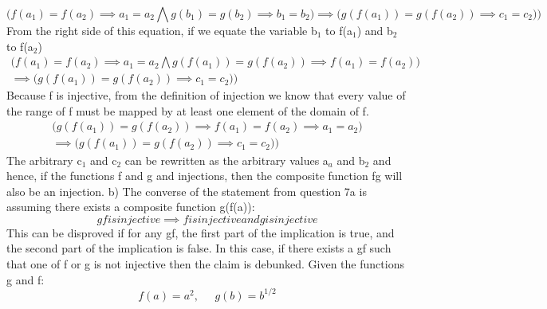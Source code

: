 \documentclass[11pt]{article}
\begin{document}
\begin{enumerate}
\begin{equation}
        \bigg( f(a_{1}) = f(a_{2}) \implies a_{1} = a_{2} \bigwedge  g(b_{1}) = g(b_{2}) \implies b_{1} = b_{2} \bigg) \implies 
    \bigg( g(f(a_{1})) = g(f(a_{2})) \implies c_{1} = c_{2}) \bigg)
\end{equation}
From the right side of this equation, if we equate the variable b$_{1}$ to f(a$_{1}$) and b$_{2}$ to f(a$_{2}$)
\begin{align*}\label{eq:pareto mle2}
   \bigg( f(a_{1}) = f(a_{2}) \implies a_{1} = a_{2} \bigwedge  g(f(a_{1})) = g(f(a_{2})) \implies f(a_{1}) = f(a_{2}) \bigg) \\ \implies 
\bigg( g(f(a_{1})) = g(f(a_{2})) \implies c_{1} = c_{2}) \bigg)
\end{align*}
Because f is injective, from the definition of injection we know that every value of the range of f must be mapped by at least one element of the domain of f. 
\begin{align*}
       \bigg(  g(f(a_{1})) = g(f(a_{2})) \implies f(a_{1}) = f(a_{2}) \implies a_{1} = a_{2} \bigg) \\ \implies \bigg( g(f(a_{1})) = g(f(a_{2})) \implies c_{1} = c_{2}) \bigg)
\end{align*}
The arbitrary c$_{1}$ and c$_{2}$ can be rewritten as the arbitrary values a$_{a}$ and b$_{2}$ and hence, if the functions f and g and injections, then the composite function fg will also be an injection.
\newline \newline
b)
\newline 
The converse of the statement from question 7a is assuming there exists a composite function g(f(a)): 
\begin{equation}
    gf is injective \implies f is injective and g is injective
\end{equation}
This can be disproved if for any gf, the first part of the implication is true, and the second part of the implication is false. In this case, if there exists a gf such that one of f or g is not injective then the claim is debunked. Given the functions g and f: 
\begin{equation}
f(a) = a^{2}, \;\;\;\;\; g(b) = b^{1/2} 
\end{equation}

\end{enumerate}
\end{document}
